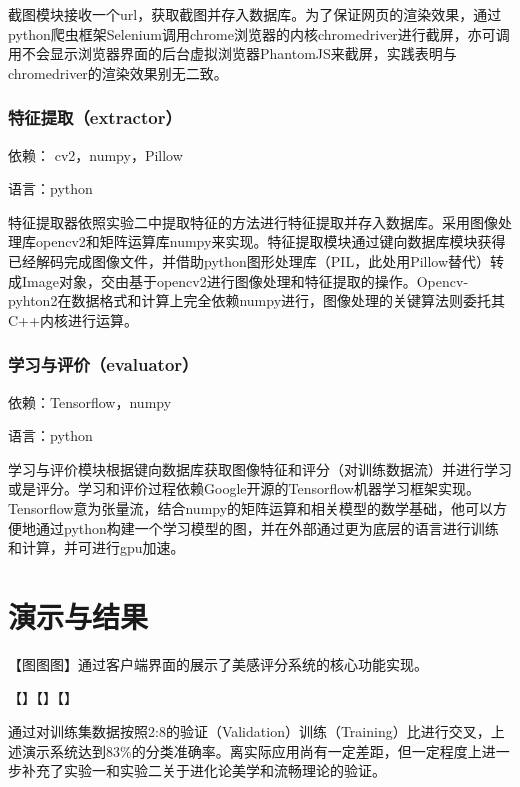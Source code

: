 截图模块接收一个url，获取截图并存入数据库。为了保证网页的渲染效果，通过python爬虫框架Selenium调用chrome浏览器的内核chromedriver进行截屏，亦可调用不会显示浏览器界面的后台虚拟浏览器PhantomJS来截屏，实践表明与chromedriver的渲染效果别无二致。

\subsubsection{特征提取（extractor）}
依赖： cv2，numpy，Pillow

语言：python

特征提取器依照实验二中提取特征的方法进行特征提取并存入数据库。采用图像处理库opencv2和矩阵运算库numpy来实现。特征提取模块通过键向数据库模块获得已经解码完成图像文件，并借助python图形处理库（PIL，此处用Pillow替代）转成Image对象，交由基于opencv2进行图像处理和特征提取的操作。Opencv-pyhton2在数据格式和计算上完全依赖numpy进行，图像处理的关键算法则委托其C++内核进行运算。

\subsubsection{学习与评价（evaluator）}
依赖：Tensorflow，numpy

语言：python

学习与评价模块根据键向数据库获取图像特征和评分（对训练数据流）并进行学习或是评分。学习和评价过程依赖Google开源的Tensorflow机器学习框架实现。Tensorflow意为张量流，结合numpy的矩阵运算和相关模型的数学基础，他可以方便地通过python构建一个学习模型的图，并在外部通过更为底层的语言进行训练和计算，并可进行gpu加速。

\section{演示与结果}
【图图图】通过客户端界面的展示了美感评分系统的核心功能实现。

【】【】【】

通过对训练集数据按照2:8的验证（Validation）训练（Training）比进行交叉，上述演示系统达到$83\%$的分类准确率。离实际应用尚有一定差距，但一定程度上进一步补充了实验一和实验二关于进化论美学和流畅理论的验证。
